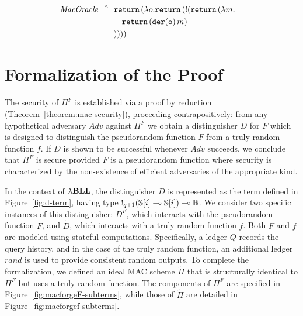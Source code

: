 \begin{equation}
\begin{aligned}\label{eq:mac-oracle}
    &\mathit{MacOracle} \;\triangleq\;
    \begin{aligned}[t]
        &\mathtt{return}\,(\lambda o.\mathtt{return}\,(\mathord{!}(\mathtt{return}\,(\lambda m. \\ 
        &\quad \mathtt{return}\,(\mathtt{der(o)}\,m) \\
        &))))
    \end{aligned}
\end{aligned}
\end{equation}


\section{Formalization of the Proof}
The security of $\Pi^F$ is established via a proof by reduction (Theorem~\ref{theorem:mac-security}), proceeding contrapositively: from any hypothetical adversary $Adv$ against $\Pi^F$ we obtain a distinguisher $D$ for $F$ which is designed to distinguish the pseudorandom function $F$ from a truly random function $f$. If $D$ is shown to be successful whenever $Adv$ succeeds, we conclude that $\Pi^F$ is secure provided $F$ is a pseudorandom function where security is characterized by the non-existence of efficient adversaries of the appropriate kind.

In the context of ${{\lambda}\mathbf{BLL}}$, the distinguisher $D$ is represented as the term defined in Figure~\ref{fig:d-term}, having type $\mathord{!}_{q+1}(\mathbb{S}[i] \multimap \mathbb{S}[i]) \multimap \mathbb{B}$. We consider two specific instances of this distinguisher: $D^F$, which interacts with the pseudorandom function $F$, and $\widetilde{D}$, which interacts with a truly random function $f$. Both $F$ and $f$ are modeled using stateful computations. Specifically, a ledger $Q$ records the query history, and in the case of the truly random function, an additional ledger $rand$ is used to provide consistent random outputs. To complete the formalization, we defined an ideal MAC scheme $\widetilde{\Pi}$ that is structurally identical to $\Pi^F$ but uses a truly random function. The components of $\Pi^F$ are specified in Figure~\ref{fig:macforgeF-subterms}, while those of $\widetilde{\Pi}$ are detailed in Figure~\ref{fig:macforgef-subterms}. 

